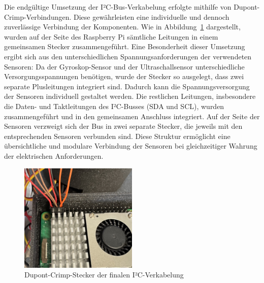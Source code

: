 Die endgültige Umsetzung der I²C-Bus-Verkabelung erfolgte mithilfe von Dupont-Crimp-Verbindungen. 
Diese gewährleisten eine individuelle und dennoch zuverlässige Verbindung der Komponenten. 
Wie in Abbildung~\ref{fig:i2c_stecker} dargestellt, wurden auf der Seite des Raspberry Pi sämtliche Leitungen in einem gemeinsamen Stecker zusammengeführt.
Eine Besonderheit dieser Umsetzung ergibt sich aus den unterschiedlichen Spannungsanforderungen der verwendeten Sensoren: 
Da der Gyroskop-Sensor und der Ultraschallsensor unterschiedliche Versorgungsspannungen benötigen, wurde der Stecker so ausgelegt, dass zwei separate Plusleitungen integriert sind. 
Dadurch kann die Spannungsversorgung der Sensoren individuell gestaltet werden.
Die restlichen Leitungen, insbesondere die Daten- und Taktleitungen des I²C-Busses (SDA und SCL), wurden zusammengeführt und in den gemeinsamen Anschluss integriert. 
Auf der Seite der Sensoren verzweigt sich der Bus in zwei separate Stecker, die jeweils mit den entsprechenden Sensoren verbunden sind. 
Diese Struktur ermöglicht eine übersichtliche und modulare Verbindung der Sensoren bei gleichzeitiger Wahrung der elektrischen Anforderungen.
\begin{figure}[ht]
    \centering
    \includegraphics[width=0.5\textwidth, keepaspectratio]{images/wohlrab_i2c_stecker.png}
    \caption{Dupont-Crimp-Stecker der finalen I²C-Verkabelung}
    \label{fig:i2c_stecker}
\end{figure}